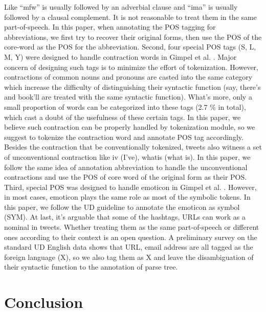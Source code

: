 \documentclass[11pt,letterpaper]{article}
\begin{document}
Like “mfw” is usually followed by an adverbial clause and “ima” is usually followed by a clausal complement. 
It is not reasonable to treat them in the same part-of-speech. 
In this paper, when annotating the POS tagging for abbreviations, we first try to recover their original forms, then use the POS of the core-word as the POS for the abbreviation.
Second, four special POS tags (S, L, M, Y) were designed to handle contraction words in Gimpel et al. . Major concern of designing such tags is to minimize the effort of tokenization. 
However, contractions of common nouns and pronouns are casted into the same category which increase the difficulty of distinguishing their syntactic function (say, there's and book'll are treated with the same syntactic function). What's more, only a small proportion of words can be categorized into these tags (2.7 \% in total), which cast a doubt of the usefulness of these certain tags. In this paper, we believe such contraction can be properly handled by tokenization module, so we suggest to tokenize the contraction word and annotate POS tag accordingly.
Besides the contraction that be conventionally tokenized, tweets also witness a set of unconventional contraction like iv (I've), whatis (what is). In this paper, we follow the same idea of annotation abbreviation to handle the unconventional contractions and use the POS of core word of the original form as their POS.
Third, special POS was designed to handle emoticon in Gimpel et al. . However, in most cases, emoticon plays the same role as most of the symbolic tokens. In this paper, we follow the UD guideline to annotate the emoticon as symbol (SYM).
At last, it’s arguable that some of the hashtags, URLs can work as a nominal in tweets. Whether treating them as the same part-of-speech or different ones according to their context is an open question. A preliminary survey on the standard UD English data shows that URL, email address are all tagged as the foreign language (X), so we also tag them as X and leave the disambiguation of their syntactic function to the annotation of parse tree.

\section{Conclusion}





\end{document}
